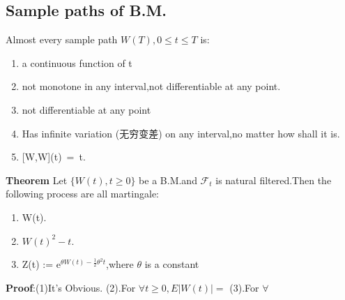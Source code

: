 \subsection*{Sample paths of B.M.}
Almost every sample path $W(T),0\le t \le T$ is:
\begin{enumerate}
    \item a continuous function of t 
    \item not monotone in any interval,not differentiable at any point.
    \item not differentiable at any point
    \item Has infinite variation (无穷变差) on any interval,no matter how shall it is.
    \item \mbox{[W,W](t) = t}.
\end{enumerate}
{\bf Theorem} Let $\{W(t),t\ge 0\}$ be a B.M.and $\mathcal{F}_t$ is natural filtered.Then the following process are all martingale:
\begin{enumerate}
    \item W(t).
    \item $W(t)^2 - t$.
    \item Z(t) := $\mathrm{e} ^{\theta W(t) - \frac{1}{2}\theta^2 t }$,where $\theta$ is a constant
\end{enumerate}
{\bf Proof}:(1)It's Obvious.
(2).For $\forall t \ge 0,E|W(t)| = $
(3).For $\forall $
